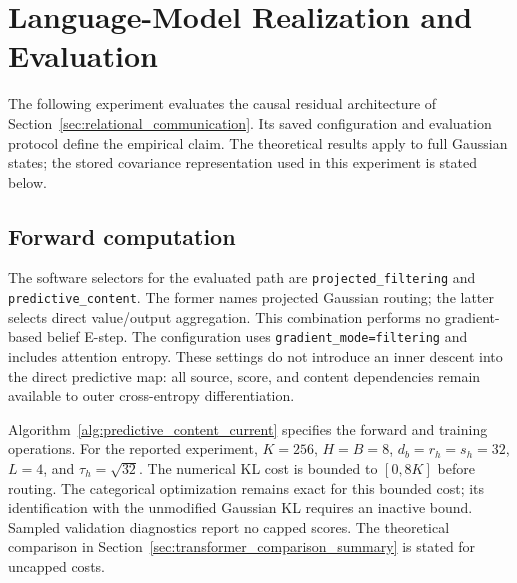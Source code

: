 \documentclass[twoside,11pt]{article}
\begin{document}
\section{Language-Model Realization and Evaluation}

The following experiment evaluates the causal residual architecture of Section~\ref{sec:relational_communication}. Its saved configuration and evaluation protocol define the empirical claim. The theoretical results apply to full Gaussian states; the stored covariance representation used in this experiment is stated below.

\subsection{Forward computation}
The software selectors for the evaluated path are \texttt{projected\_\allowbreak filtering} and \texttt{predictive\_\allowbreak content}. The former names projected Gaussian routing; the latter selects direct value/output aggregation. This combination performs no gradient-based belief E-step. The configuration uses \texttt{gradient\_\allowbreak mode=\allowbreak filtering} and includes attention entropy. These settings do not introduce an inner descent into the direct predictive map: all source, score, and content dependencies remain available to outer cross-entropy differentiation.

Algorithm~\ref{alg:predictive_content_current} specifies the forward and training operations. For the reported experiment, \(K=256\), \(H=B=8\), \(d_b=r_h=s_h=32\), \(L=4\), and \(\tau_h=\sqrt{32}\). The numerical KL cost is bounded to \([0,8K]\) before routing. The categorical optimization remains exact for this bounded cost; its identification with the unmodified Gaussian KL requires an inactive bound. Sampled validation diagnostics report no capped scores. The theoretical comparison in Section~\ref{sec:transformer_comparison_summary} is stated for uncapped costs.
\end{document}
